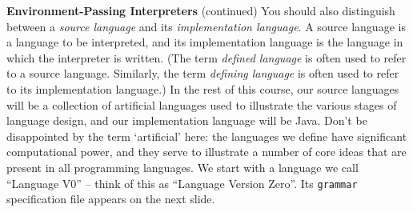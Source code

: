 \begin{minipage}[t]{\sw}
\slidenumber
\LARGE
{\bf Environment-Passing Interpreters} (continued)\exx
You should also distinguish
between a {\em source language}
and its {\em implementation language}.
A source language is a language to be interpreted,
and its implementation language is the language
in which the interpreter is written.
(The term {\em defined language} is often used
to refer to a source language.
Similarly, the term {\em defining language} is often used
to refer to its implementation language.)\exx
In the rest of this course,
our source languages will be a collection of artificial languages used
to illustrate the various stages of language design,
and our implementation language will be Java.
Don't be disappointed by the term `artificial' here:
the languages we define have significant computational power,
and they serve to illustrate
a number of core ideas that are present in all programming languages.\exx
We start with a language we call ``Language V0'' --
think of this as ``Language Version Zero''.
Its \verb'grammar' specification file appears on the next slide.
\end{minipage}
\clearpage
